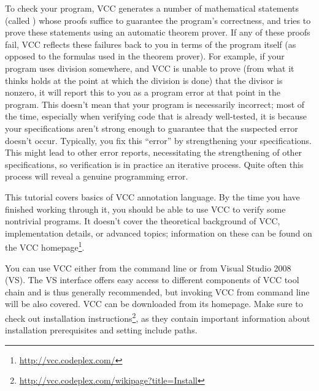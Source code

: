 To check your program, VCC generates a number of mathematical
statements (called ) whose proofs
suffice to guarantee the program's correctness, and tries to prove
these statements using an automatic theorem prover. If any of these
proofs fail, VCC reflects these failures back to you in terms of the
program itself (as opposed to the formulas used in the theorem prover).
For example, if your program uses division
somewhere, and VCC is unable to prove (from what it thinks holds at the
point at which the division is done) that the divisor is nonzero, it
will report this to you as a program error at that point in the
program. 
This doesn't mean that your program is necessarily incorrect;
most of the time, especially when verifying code that is already well-tested,
it is because your specifications aren't strong
enough to guarantee that the suspected error doesn't occur.
Typically, you fix this ``error'' by strengthening your
specifications. This might lead to other error reports, necessitating
the strengthening of other specifications, so verification is in
practice an iterative process.  
Quite often this process will reveal a genuine programming error.

This tutorial covers basics of VCC annotation language. By the time
you have finished working through it, you should be able to use VCC to
verify some nontrivial programs. It doesn't cover the theoretical
background of VCC, implementation details, or advanced topics;
information on these can be found on the VCC
homepage\footnote{\url{http://vcc.codeplex.com/}}.


You can use VCC either from the command line or from Visual Studio
2008 (VS).
The VS interface offers easy access to different components of
VCC tool chain and is thus generally recommended,
but invoking VCC from command line will be also covered.
VCC can be downloaded from its homepage.
Make sure to check out installation instructions\footnote{\url{http://vcc.codeplex.com/wikipage?title=Install}},
as they contain important information about installation prerequisites 
and setting include paths.


